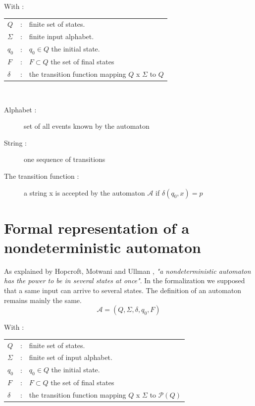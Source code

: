 With :

\begin{tabular}{lll}
$Q$ & : & finite set of states.\\
$\Sigma$ & :& finite input alphabet.\\
$q_0$ & :& $q_0 \in Q$ the initial state.\\
$F$ & :& $F \subset Q$ the set of final states\\
$\delta$ & :& the transition function mapping $Q$ x $\Sigma$ to $Q$
\end{tabular}\\
\begin{description}
\item [Alphabet :] set of all events known by the automaton
\item [String :] one sequence of transitions
\item [The transition function :] a string x is accepted by the automaton $\mathcal{A}$  if $\delta(q_0,x)=p$
\end{description}


\section{Formal representation of a nondeterministic automaton}
As explained by Hopcroft, Motwani and Ullman \cite{introductionAutomataTheoryLangageComputation_2007}, \textit{"a nondeterministic automaton has the power to be in several states at once"}. In the formalization we supposed that a same input can arrive to several states. The definition of an automaton remains mainly the same.
\begin{equation}
\mathcal{A} = ( Q, \Sigma,\delta,q_0,F )
\end{equation}

With :

\begin{tabular}{lll}
$Q$ & : & finite set of states.\\
$\Sigma$ & :& finite set of input alphabet.\\
$q_0$ & :& $q_0 \in Q$ the initial state.\\
$F$ & :& $F \subset Q$ the set of final states\\
$\delta$ & :& the transition function mapping $Q$ x $\Sigma$ to $\mathcal{P}(Q)$
\end{tabular}\\

